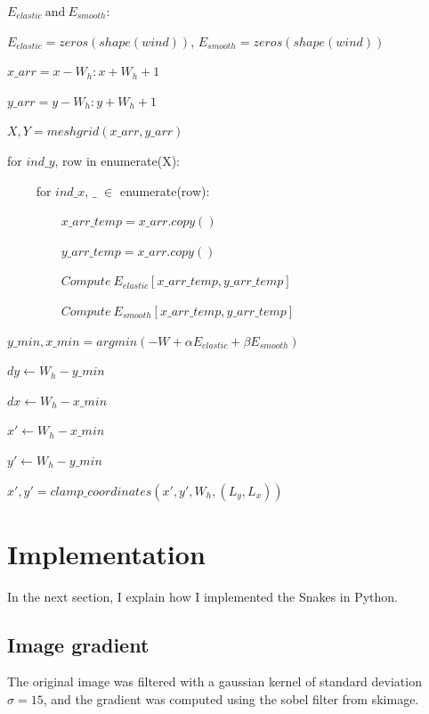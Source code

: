 \documentclass[24pt]{article}
\begin{document}
$$ $$ 

$E_{elastic}~ \text{and}~ E_{smooth}:$
             
$E_{elastic} = zeros(shape(wind))$, $E_{smooth}  = zeros(shape(wind))$

       
$x\_arr =  x - W_h : x + W_h + 1$       

$y\_arr =  y - W_h : y + W_h + 1$ 

$ X, Y  = meshgrid(x\_arr, y\_arr) $  
                
for $ind\_y$, row in enumerate(X):

~~~~ for $ind\_x$, $\_$ $\in$
 enumerate(row):          
       
~~~~~~~~       $x\_arr\_temp = x\_arr.copy()$   
       
~~~~~~~~       $y\_arr\_temp = x\_arr.copy()$   
       
~~~~~~~~	   $Compute ~E_{elastic}[ x\_arr\_temp, y\_arr\_temp]$ 
	   
~~~~~~~~ 	   $Compute ~ E_{smooth}[ x\_arr\_temp, y\_arr\_temp]$ 

$y\_min, x\_min =  argmin(-W + \alpha E_{elastic} + \beta E_{smooth})$

$dy \leftarrow W_h - y\_min            $

$dx \leftarrow W_h - x\_min            $

$x' \leftarrow W_h  - x\_min$   
    
$y' \leftarrow W_h  - y\_min$   
   
$x', y' = clamp\_coordinates(x', y', W_h, (L_y, L_x))$
   
   
   
   






\newpage
 

\section{Implementation}
 
In the next section, I explain how I implemented the Snakes in Python. 

\subsection{Image gradient}

The original image was filtered with a gaussian kernel of standard deviation $\sigma = 15$, and the gradient was computed using the sobel filter from skimage. 
\end{document}
